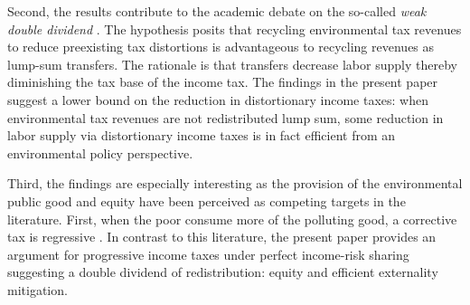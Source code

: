 Second, the results contribute to the academic debate on the so-called \textit{weak double dividend} \citep[for example:][]{LansBovenberg1994EnvironmentalTaxation, LansBovenberg1996OptimalAnalyses}. The hypothesis posits that recycling environmental tax revenues to reduce preexisting tax distortions is advantageous to recycling  revenues as lump-sum transfers. The rationale is that transfers decrease labor supply thereby diminishing the tax base of the income tax. %
The findings in the present paper suggest a lower bound on the reduction in distortionary income taxes: when environmental tax revenues are not redistributed lump sum, some reduction in labor supply via distortionary income taxes is in fact efficient from an environmental policy perspective. %

Third, the findings are especially interesting as the provision of the environmental public good and equity have been perceived as competing targets in the literature. First, when the poor consume more of the polluting good, a corrective tax is regressive \citep{ Fried2018TheGenerations, Sager2019IncomeCurves}. %
In contrast to this literature, the present paper provides an argument for progressive income taxes under perfect income-risk sharing suggesting a double dividend of redistribution: equity and efficient externality mitigation. %
